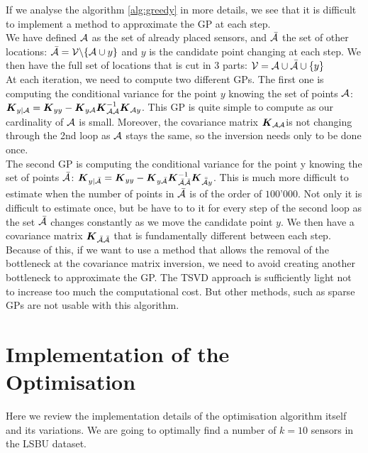 If we analyse the algorithm \ref{alg:greedy} in more details, we see that it is difficult to implement a method to approximate the GP at each step. \\

We have defined $\mathcal{A}$ as the set of already placed sensors, and $\bar{\mathcal{A}}$ the set of other locations: $\bar{\mathcal{A}} = \mathcal{V} \backslash \{\mathcal{A} \cup y\} $ and $y$ is the candidate point changing at each step. We then have the full set of locations that is cut in 3 parts: $ \mathcal{V} = \mathcal{A} \cup \bar{\mathcal{A}} \cup \{y\} $ \\

At each iteration, we need to compute two different GPs. The first one is computing the conditional variance for the point $y$ knowing the set of points $\mathcal{A}$:   ${\boldsymbol{{K}}}_{y | \mathcal{A}} =  {\boldsymbol{{K}}}_{yy} - {\boldsymbol{{K}}}_{y\mathcal{A}} {\boldsymbol{{K}}}_{\mathcal{A}\mathcal{A}}^{-1} {\boldsymbol{{K}}}_{\mathcal{A} y} $. This GP is quite simple to compute as our cardinality of $\mathcal{A}$ is small. Moreover, the covariance matrix  ${\boldsymbol{{K}}}_{\mathcal{A}\mathcal{A}}$is not changing through the 2nd loop as $\mathcal{A}$ stays the same, so the inversion needs only to be done once. \\

The second GP is computing the conditional variance for the point y knowing the set of points $\bar{\mathcal{A}}$: ${\boldsymbol{{K}}}_{y | \bar{\mathcal{A}}} =  {\boldsymbol{{K}}}_{yy} - {\boldsymbol{{K}}}_{y\bar{\mathcal{A}}} {\boldsymbol{{K}}}_{\bar{\mathcal{A}}\bar{\mathcal{A}}}^{-1} {\boldsymbol{{K}}}_{\bar{\bar{\mathcal{A}}} y} $. This is much more difficult to estimate when the number of points in $\bar{\mathcal{A}}$ is of the order of $100’000$. Not only it is difficult to estimate once, but be have to to it for every step of the second loop as the set $\bar{\mathcal{A}}$ changes constantly as we move the candidate point $y$. We then have a covariance matrix ${\boldsymbol{{K}}}_{\bar{\mathcal{A}}\bar{\mathcal{A}}}$ that is fundamentally different between each step. \\

Because of this, if we want to use a method that allows the removal of the bottleneck at the covariance matrix inversion, we need to avoid creating another bottleneck to approximate the GP. The TSVD approach is sufficiently light not to increase too much the computational cost. But other methods, such as sparse GPs are not usable with this algorithm. 



\section{Implementation of the Optimisation}

Here we review the implementation details of the optimisation algorithm itself and its variations. We are going to optimally find a number of $k=10$ sensors in the LSBU dataset.  


